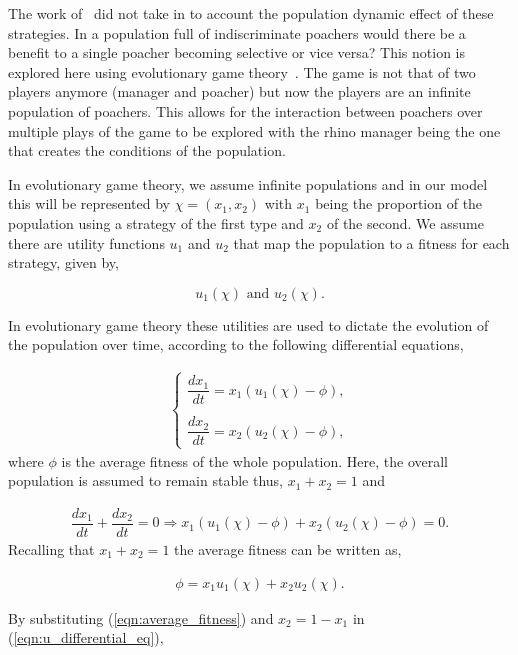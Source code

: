 \documentclass[10pt]{article}
\begin{document}
The work of~\cite{Lee} did not take in to account the population dynamic effect
of these strategies. In a population full of indiscriminate poachers would there
be a benefit to a single poacher becoming selective or vice versa? This notion
is explored here using evolutionary game theory~\cite{Smith}. The
game is not that of two players anymore (manager and poacher) but now the players
are an infinite population of poachers. This allows for the interaction between
poachers over multiple plays of the game to be explored with the rhino manager
being the one that creates the conditions of the population.

In evolutionary game theory, we assume infinite populations and in our
model this will be represented by \(\chi=(x_1, x_2)\) with \(x_1\) being the proportion
of the population using a strategy of the first type and \(x_2\) of the second. We
assume there are utility functions \(u_1\) and \(u_2\) that map the population
to a fitness for each strategy, given by,

\[ u_1(\chi)  \text{ and } u_2(\chi).\] 

In evolutionary game theory these utilities are used to dictate the evolution of
the population over time, according to the following differential equations,

\begin{eqnarray}
    \label{eqn:u_differential_eq}
    \left\{
    \begin{array}{cl}
    \dfrac{dx_1}{dt}=x_1(u_1(\chi)-\phi),
    \\
    \\
    \dfrac{dx_2}{dt}= x_2(u_2(\chi)-\phi),
    \end{array} \right.
\end{eqnarray}
where \(\phi\) is the average fitness of the whole population. Here, the overall
population is assumed to remain stable thus, \(x_1 + x_2 = 1 \) and

\begin{eqnarray}
    \dfrac{dx_1}{dt}  + \dfrac{dx_2}{dt} = 0 \Rightarrow x_1(u_1(\chi) - \phi)
     + x_2(u_2(\chi) - \phi)=0.
\end{eqnarray} 
Recalling that \(x_1 + x_2 = 1\) the average fitness can be written as,

\begin{eqnarray}
\label{eqn:average_fitness}
    \phi=x_1u_1(\chi) + x_2u_2(\chi).
\end{eqnarray}

By substituting (\ref{eqn:average_fitness}) and \(x_2= 1 - x_1\) 
in (\ref{eqn:u_differential_eq}),
\end{document}
